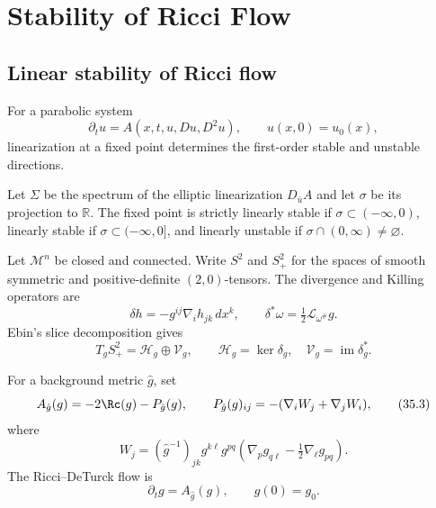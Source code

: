 \chapter[35]{Stability of Ricci Flow}
\label{ch:chow-iv-stability-ricci-flow}

\section{Linear stability of Ricci flow}

For a parabolic system
\begin{equation*}
 \partial_tu=A(x,t,u,Du,D^2u),\qquad u(x,0)=u_0(x),
 \tag{35.1}
\end{equation*}
linearization at a fixed point determines the first-order stable and unstable
directions.

\begin{definition}
\label{def:chow-iv-linear-stability}
Let $\Sigma$ be the spectrum of the elliptic linearization
$D_{\bar u}A$ and let $\sigma$ be its projection to $\mathbb R$.  The fixed
point is strictly linearly stable if $\sigma\subset(-\infty,0)$, linearly
stable if $\sigma\subset(-\infty,0]$, and linearly unstable if
$\sigma\cap(0,\infty)\ne\varnothing$.
\end{definition}

Let $\mathcal M^n$ be closed and connected.  Write $S^2$ and $S^2_+$ for the
spaces of smooth symmetric and positive-definite $(2,0)$-tensors.  The
divergence and Killing operators are
\[
 \delta h=-g^{ij}\nabla_i h_{jk}\,dx^k,
 \qquad \delta^*\omega=\tfrac12\mathcal L_{\omega^\#}g.
\]
Ebin's slice decomposition gives
\begin{equation*}
 T_gS^2_+=\mathcal H_g\oplus\mathcal V_g,
 \qquad \mathcal H_g=\ker\delta_g,\quad
 \mathcal V_g=\operatorname{im}\delta_g^*.
 \tag{35.2}
\end{equation*}

For a background metric $\hat g$, set
\begin{equation*}
 A_{\hat g}(g)=-2\Rc(g)-P_{\hat g}(g),
 \qquad P_{\hat g}(g)_{ij}=-(\nabla_iW_j+\nabla_jW_i),
 \tag{35.3}
\end{equation*}
where
\[
 W_j=(\hat g^{-1})_{jk}g^{k\ell}g^{pq}
 \left(\nabla_pg_{q\ell}-\tfrac12\nabla_\ell g_{pq}\right).
\]
The Ricci--DeTurck flow is
\begin{equation*}
 \partial_tg=A_{\hat g}(g),\qquad g(0)=g_0.
 \tag{35.5}
\end{equation*}

